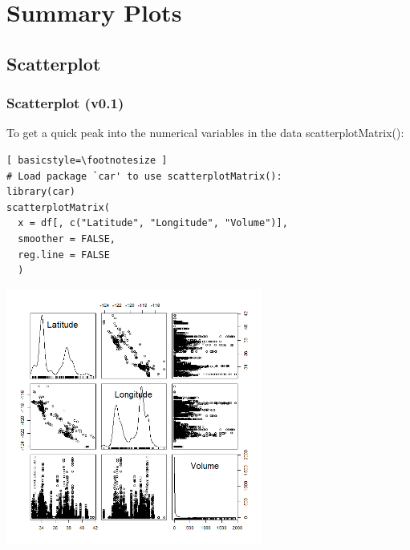 \section[Summary Plots]{Summary Plots}

\subsection{Scatterplot}
\begin{frame}
\frametitle{Scatterplot (v0.1)}

To get a quick peak into the numerical variables in the data \ttfamily scatterplotMatrix(): \normalfont
  		\begin{lstlisting}[ basicstyle=\footnotesize ]
# Load package `car' to use scatterplotMatrix():	
library(car)	
scatterplotMatrix(
  x = df[, c("Latitude", "Longitude", "Volume")], 
  smoother = FALSE, 
  reg.line = FALSE
  )
		\end{lstlisting}

        \begin{center}
         \includegraphics[width=0.63\textwidth]{images/scatterPlot_v0.png}
        \end{center}
\end{frame}

